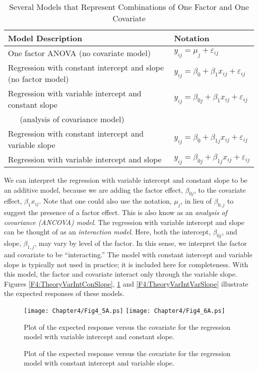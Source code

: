  \begin{center}  \begin{table}[h]
\caption{\label{T4:OneFactorCovariate}  Several Models that
Represent Combinations of One Factor and One Covariate}
\begin{tabular}{ll}
\hline Model Description & Notation \\ \hline One factor ANOVA (no
covariate model) &
$y_{ij}=\mu _{j}+\varepsilon_{ij}$ \\
Regression with constant intercept and slope (no factor
model) & $y_{ij}=\beta _{0}+\beta _{1}x_{ij}+\varepsilon_{ij}$ \\
Regression with variable intercept and constant slope &
$y_{ij}=\beta _{0j}+\beta _{1}x_{ij}+\varepsilon_{ij}$ \\
~~~(analysis of covariance model) &  \\
Regression with constant intercept and variable slope &
$y_{ij}=\beta _{0}+\beta _{1j}x_{ij}+\varepsilon_{ij}$ \\
Regression with variable intercept and slope &
$y_{ij}=\beta _{0j}+\beta _{1j}x_{ij}+\varepsilon_{ij}$ \\
\hline
\end{tabular}
\end{table}  \end{center}  

We can interpret the regression with variable intercept and constant
slope to be an additive model, because we are adding the factor
effect, $\beta _{0j}$, to the covariate effect, $\beta _{1}x_{ij}$.
Note that one could also use the notation, $\mu _{j}$, in lieu of
$\beta _{0,j}$ to suggest the presence of a factor effect. This is
also know as an \emph{analysis of covariance (ANCOVA) model}. The
regression with variable intercept and slope can be thought of as an
\emph{interaction model}. Here, both the intercept, $\beta _{0j}$,
and slope, $\beta _{1,j}$, may vary by level of the factor. In this
sense, we interpret the factor and covariate to be ``interacting.''
The model with constant intercept and variable slope is typically
not used in practice; it is included here for completeness. With
this model, the factor and covariate interact only through the
variable slope. Figures \ref{F4:TheoryVarIntConSlope},
\ref{F4:TheoryConIntVarSlope} and \ref{F4:TheoryVarIntVarSlope}
illustrate the expected responses of these models.



\begin{figure}[htp]
  \begin{center}
    \texttt{[image: Chapter4/Fig4\_5A.ps]}
    \texttt{[image: Chapter4/Fig4\_6A.ps]} \hfill
     \parbox[t]{2.5in}{\caption{\label{F4:TheoryVarIntConSlope} \small  Plot of the expected response versus the covariate for the regression model
with variable intercept and constant slope.}} \hfill
    \parbox[t]{2.5in}{\caption{\label{F4:TheoryConIntVarSlope} \small  Plot of the expected response versus the covariate for the regression model
with constant intercept and variable slope.}}
  \end{center}
\end{figure}


